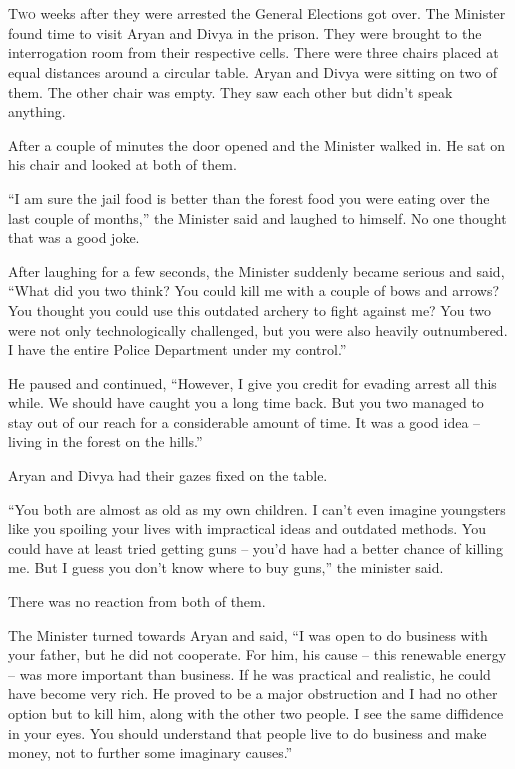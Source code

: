 \chapter{}

\lettrine{T}{wo} weeks after they were arrested the General Elections got over. The Minister
found time to visit Aryan and Divya in the prison. They were brought to the
interrogation room from their respective cells. There were three chairs placed
at equal distances around a circular table. Aryan and Divya were sitting on two
of them. The other chair was empty. They saw each other but didn't speak
anything.

After a couple of minutes the door opened and the Minister walked in. He sat on
his chair and looked at both of them.

“I am sure the jail food is better than the forest food you were eating over the
last couple of months,” the Minister said and laughed to himself. No one thought
that was a good joke.

After laughing for a few seconds, the Minister suddenly became serious and said,
“What did you two think? You could kill me with a couple of bows and arrows? You
thought you could use this outdated archery to fight against me? You two were
not only technologically challenged, but you were also heavily outnumbered. I
have the entire Police Department under my control.”

He paused and continued, “However, I give you credit for evading arrest all this
while. We should have caught you a long time back. But you two managed to stay
out of our reach for a considerable amount of time. It was a good idea – living
in the forest on the hills.”

Aryan and Divya had their gazes fixed on the table.

“You both are almost as old as my own children. I can't even imagine youngsters
like you spoiling your lives with impractical ideas and outdated methods. You
could have at least tried getting guns – you'd have had a better chance of
killing me. But I guess you don't know where to buy guns,” the minister said.

There was no reaction from both of them.

The Minister turned towards Aryan and said, “I was open to do business with your
father, but he did not cooperate. For him, his cause – this renewable energy –
was more important than business. If he was practical and realistic, he could
have become very rich. He proved to be a major obstruction and I had no other
option but to kill him, along with the other two people. I see the same
diffidence in your eyes. You should understand that people live to do business
and make money, not to further some imaginary causes.”

